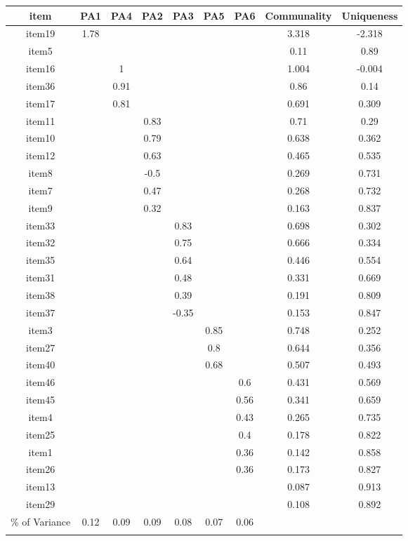 \documentclass[
  english,
  man]{apa6}
\begin{document}
\begin{appendix}
\begin{table}[tbp]
\begin{center}
\begin{threeparttable}
{\begin{tabular}{ccccccccc}
\toprule
item & \multicolumn{1}{c}{PA1} & \multicolumn{1}{c}{PA4} & \multicolumn{1}{c}{PA2} & \multicolumn{1}{c}{PA3} & \multicolumn{1}{c}{PA5} & \multicolumn{1}{c}{PA6} & \multicolumn{1}{c}{Communality} & \multicolumn{1}{c}{Uniqueness}\\
\midrule
item19 & 1.78 &  &  &  &  &  & 3.318 & -2.318\\
item5 &  &  &  &  &  &  & 0.11 & 0.89\\
item16 &  & 1 &  &  &  &  & 1.004 & -0.004\\
item36 &  & 0.91 &  &  &  &  & 0.86 & 0.14\\
item17 &  & 0.81 &  &  &  &  & 0.691 & 0.309\\
item11 &  &  & 0.83 &  &  &  & 0.71 & 0.29\\
item10 &  &  & 0.79 &  &  &  & 0.638 & 0.362\\
item12 &  &  & 0.63 &  &  &  & 0.465 & 0.535\\
item8 &  &  & -0.5 &  &  &  & 0.269 & 0.731\\
item7 &  &  & 0.47 &  &  &  & 0.268 & 0.732\\
item9 &  &  & 0.32 &  &  &  & 0.163 & 0.837\\
item33 &  &  &  & 0.83 &  &  & 0.698 & 0.302\\
item32 &  &  &  & 0.75 &  &  & 0.666 & 0.334\\
item35 &  &  &  & 0.64 &  &  & 0.446 & 0.554\\
item31 &  &  &  & 0.48 &  &  & 0.331 & 0.669\\
item38 &  &  &  & 0.39 &  &  & 0.191 & 0.809\\
item37 &  &  &  & -0.35 &  &  & 0.153 & 0.847\\
item3 &  &  &  &  & 0.85 &  & 0.748 & 0.252\\
item27 &  &  &  &  & 0.8 &  & 0.644 & 0.356\\
item40 &  &  &  &  & 0.68 &  & 0.507 & 0.493\\
item46 &  &  &  &  &  & 0.6 & 0.431 & 0.569\\
item45 &  &  &  &  &  & 0.56 & 0.341 & 0.659\\
item4 &  &  &  &  &  & 0.43 & 0.265 & 0.735\\
item25 &  &  &  &  &  & 0.4 & 0.178 & 0.822\\
item1 &  &  &  &  &  & 0.36 & 0.142 & 0.858\\
item26 &  &  &  &  &  & 0.36 & 0.173 & 0.827\\
item13 &  &  &  &  &  &  & 0.087 & 0.913\\
item29 &  &  &  &  &  &  & 0.108 & 0.892\\
\% of Variance & 0.12 & 0.09 & 0.09 & 0.08 & 0.07 & 0.06 &  & \\
\bottomrule
\addlinespace
\end{tabular}

}
\end{threeparttable}
\end{center}
\end{table}
\end{appendix}
\end{document}
